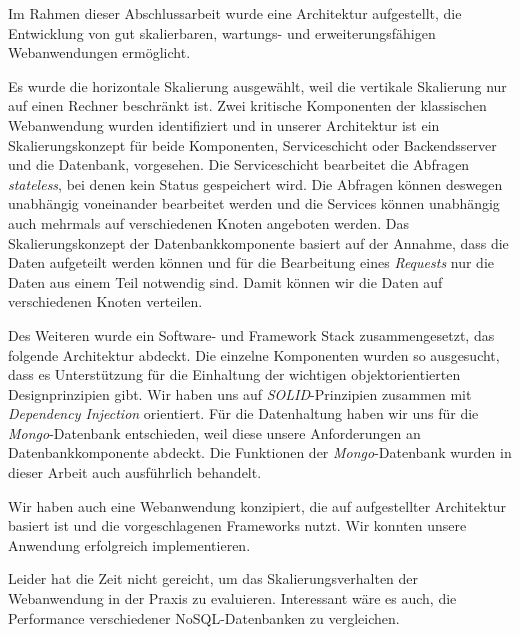 
Im Rahmen dieser Abschlussarbeit wurde eine Architektur aufgestellt, die Entwicklung von gut skalierbaren, wartungs- und erweiterungsfähigen Webanwendungen ermöglicht.

Es wurde die horizontale Skalierung ausgewählt, weil die vertikale Skalierung nur auf einen Rechner beschränkt ist. Zwei kritische Komponenten der klassischen Webanwendung wurden identifiziert und in unserer Architektur ist ein Skalierungskonzept für beide Komponenten, Serviceschicht  oder Backendsserver und die Datenbank, vorgesehen. Die Serviceschicht bearbeitet die Abfragen \textit{stateless}, bei denen kein Status gespeichert wird. Die Abfragen können deswegen unabhängig voneinander bearbeitet werden und die Services können unabhängig auch mehrmals auf verschiedenen Knoten angeboten werden. Das Skalierungskonzept der Datenbankkomponente basiert auf der Annahme, dass die Daten aufgeteilt werden können und für die Bearbeitung eines \textit{Requests} nur die Daten aus einem Teil notwendig sind. Damit können wir die Daten auf verschiedenen Knoten verteilen.

Des Weiteren wurde ein Software- und Framework Stack zusammengesetzt, das folgende Architektur abdeckt. Die einzelne Komponenten wurden so ausgesucht, dass es Unterstützung für die Einhaltung der wichtigen objektorientierten Designprinzipien gibt. Wir haben uns auf \textit{SOLID}-Prinzipien zusammen mit \textit{Dependency Injection} orientiert. Für die Datenhaltung haben wir uns für die \textit{Mongo}-Datenbank entschieden, weil diese unsere Anforderungen an Datenbankkomponente abdeckt. Die Funktionen der \textit{Mongo}-Datenbank wurden in dieser Arbeit auch ausführlich behandelt. 

Wir haben auch eine Webanwendung konzipiert, die auf aufgestellter Architektur basiert ist und die vorgeschlagenen Frameworks nutzt. Wir konnten unsere Anwendung erfolgreich implementieren.

Leider hat die Zeit nicht gereicht, um das Skalierungsverhalten der Webanwendung in der Praxis zu evaluieren. Interessant wäre es auch, die Performance verschiedener NoSQL-Datenbanken zu vergleichen. 

